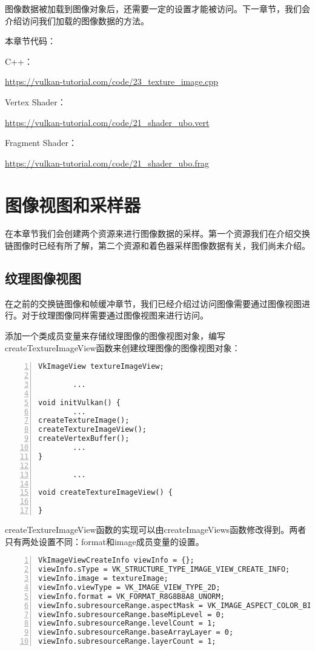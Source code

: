 \documentclass{ctexart}
\begin{document}
图像数据被加载到图像对象后，还需要一定的设置才能被访问。下一章节，我们会介绍访问我们加载的图像数据的方法。

本章节代码：

C++：

\url{https://vulkan-tutorial.com/code/23_texture_image.cpp}

Vertex Shader：

\url{https://vulkan-tutorial.com/code/21_shader_ubo.vert}

Fragment Shader：

\url{https://vulkan-tutorial.com/code/21_shader_ubo.frag}

\newpage
\section{图像视图和采样器}

在本章节我们会创建两个资源来进行图像数据的采样。第一个资源我们在介绍交换链图像时已经有所了解，第二个资源和着色器采样图像数据有关，我们尚未介绍。

\subsection{纹理图像视图}

在之前的交换链图像和帧缓冲章节，我们已经介绍过访问图像需要通过图像视图进行。对于纹理图像同样需要通过图像视图来进行访问。

添加一个类成员变量来存储纹理图像的图像视图对象，编写createTextureImageView函数来创建纹理图像的图像视图对象：

\begin{lstlisting}[language={[ANSI]C},keywordstyle=\color{blue!70},commentstyle=\color{red!50!green!50!blue!50},frame=shadowbox, rulesepcolor=\color{red!20!green!20!blue!20},basicstyle=\small,numbers=left, numberstyle=\tiny,breaklines=true]
VkImageView textureImageView;

		...

void initVulkan() {
		...
createTextureImage();
createTextureImageView();
createVertexBuffer();
		...
}

		...

void createTextureImageView() {

}
\end{lstlisting}

createTextureImageView函数的实现可以由createImageViews函数修改得到。两者只有两处设置不同：format和image成员变量的设置。

\begin{lstlisting}[language={[ANSI]C},keywordstyle=\color{blue!70},commentstyle=\color{red!50!green!50!blue!50},frame=shadowbox, rulesepcolor=\color{red!20!green!20!blue!20},basicstyle=\small,numbers=left, numberstyle=\tiny,breaklines=true]
VkImageViewCreateInfo viewInfo = {};
viewInfo.sType = VK_STRUCTURE_TYPE_IMAGE_VIEW_CREATE_INFO;
viewInfo.image = textureImage;
viewInfo.viewType = VK_IMAGE_VIEW_TYPE_2D;
viewInfo.format = VK_FORMAT_R8G8B8A8_UNORM;
viewInfo.subresourceRange.aspectMask = VK_IMAGE_ASPECT_COLOR_BIT;
viewInfo.subresourceRange.baseMipLevel = 0;
viewInfo.subresourceRange.levelCount = 1;
viewInfo.subresourceRange.baseArrayLayer = 0;
viewInfo.subresourceRange.layerCount = 1;
\end{lstlisting}
\end{document}
